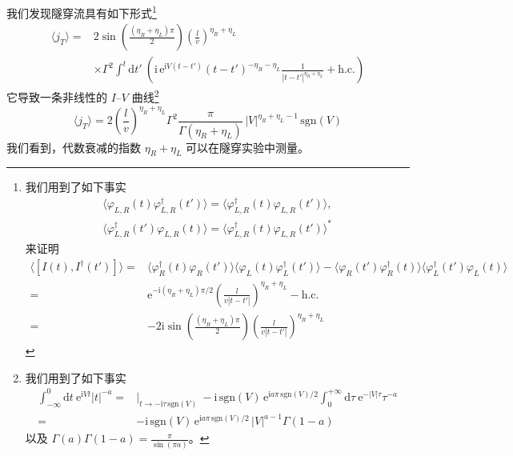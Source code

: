 我们发现隧穿流具有如下形式\footnote{我们用到了如下事实
\begin{gather*}
\big\langle\varphi_{L,R}(t)\varphi_{L,R}^{\dagger}(t')\big\rangle = \big\langle\varphi_{L,R}^{\dagger}(t)\varphi_{L,R}(t')\big\rangle,\\
\big\langle\varphi_{L,R}^{\dagger}(t')\varphi_{L,R}(t)\big\rangle = \big\langle\varphi_{L,R}^{\dagger}(t)\varphi_{L,R}(t')\big\rangle^{*}
\end{gather*}
来证明
\begin{align*}
\big\langle[I(t), I^{\dagger}(t')]\big\rangle ={}& \big\langle\varphi_{R}^{\dagger}(t)\varphi_{R}(t')\big\rangle\big\langle\varphi_{L}(t)\varphi_{L}^{\dagger}(t')\big\rangle - \big\langle\varphi_{R}(t')\varphi_{R}^{\dagger}(t)\big\rangle\big\langle\varphi_{L}^{\dagger}(t')\varphi_{L}(t)\big\rangle\\
={}& \mathrm{e}^{-\mathrm{i}(\eta_{R}+\eta_{L})\pi/2}\left(\frac{l}{v|t-t'|}\right)^{\eta_{R}+\eta_{L}} - \text{h.c.}\\
={}& -2\mathrm{i}\sin\left(\frac{(\eta_{R}+\eta_{L})\pi}{2}\right)\left(\frac{l}{v|t-t'|}\right)^{\eta_{R}+\eta_{L}}
\end{align*}}
\begin{align*}
\langle j_{T}\rangle ={}& 2\sin\left(\frac{(\eta_{R}+\eta_{L})\pi}{2}\right)\left(\frac{l}{v}\right)^{\eta_{R}+\eta_{L}}\\
&\times \Gamma^{2}\int^{t}\mathrm{d}t'\ \left(\mathrm{i}\,\mathrm{e}^{\mathrm{i}V(t-t')}(t-t')^{-\eta_{R}-\eta_{L}}\frac{1}{|t-t'|^{\eta_{R}+\eta_{L}}} + \text{h.c.}\right)
\end{align*}
它导致一条非线性的 $I$--$V$ 曲线\footnote{我们用到了如下事实
\begin{align*}
\int_{-\infty}^{0}\mathrm{d}t\ \mathrm{e}^{\mathrm{i}Vt}|t|^{-a} ={}& \Big|_{t\to-\mathrm{i}\tau\,\mathrm{sgn}(V)}\ -\mathrm{i}\,\mathrm{sgn}(V)\,\mathrm{e}^{\mathrm{i}a\pi\,\mathrm{sgn}(V)/2}\int_{0}^{+\infty}\mathrm{d}\tau\ \mathrm{e}^{-|V|\tau}\tau^{-a}\\
={}& -\mathrm{i}\,\mathrm{sgn}(V)\,\mathrm{e}^{\mathrm{i}a\pi\,\mathrm{sgn}(V)/2}\,|V|^{a-1}\Gamma(1-a)
\end{align*}
以及 $\Gamma(a)\Gamma(1-a) = \frac{\pi}{\sin(\pi a)}$。}
\begin{equation*}
\langle j_{T}\rangle = 2\left(\frac{l}{v}\right)^{\eta_{R}+\eta_{L}}\Gamma^{2}\frac{\pi}{\Gamma(\eta_{R}+\eta_{L})}\,|V|^{\eta_{R}+\eta_{L}-1}\,\mathrm{sgn}(V)
\end{equation*}
我们看到，代数衰减的指数 $\eta_{R}+\eta_{L}$ 可以在隧穿实验中测量。

